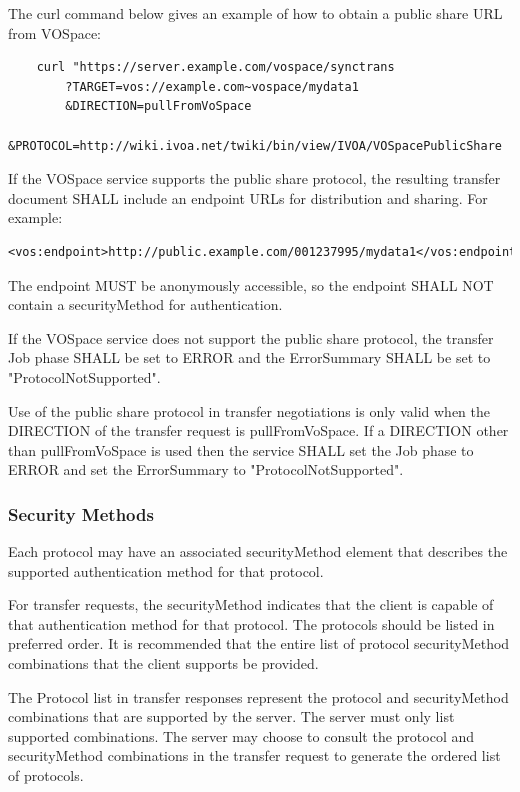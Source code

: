 \documentclass[11pt,a4paper]{ivoa}
\begin{document}
The curl command below gives an example of how to obtain a public share URL from VOSpace:

\begin{verbatim}
    curl "https://server.example.com/vospace/synctrans
        ?TARGET=vos://example.com~vospace/mydata1
        &DIRECTION=pullFromVoSpace
        &PROTOCOL=http://wiki.ivoa.net/twiki/bin/view/IVOA/VOSpacePublicShare
\end{verbatim}

If the VOSpace service supports the public share protocol, the resulting transfer document SHALL include an endpoint URLs for distribution and sharing.  For example:

\begin{verbatim}<vos:endpoint>http://public.example.com/001237995/mydata1</vos:endpoint>\end{verbatim}

The endpoint MUST be anonymously accessible, so the endpoint SHALL NOT contain a securityMethod for authentication.

If the VOSpace service does not support the public share protocol, the transfer Job phase SHALL be set to ERROR and the ErrorSummary SHALL be set to "ProtocolNotSupported".

Use of the public share protocol in transfer negotiations is only valid when the DIRECTION of the transfer request is pullFromVoSpace.	  If a DIRECTION other than pullFromVoSpace is used then the service SHALL set the Job phase to ERROR and set the ErrorSummary to "ProtocolNotSupported".

\subsubsection{Security Methods}
Each protocol may have an associated securityMethod element that describes the supported authentication method for that protocol.

For transfer requests, the securityMethod indicates that the client is capable of that authentication method for that protocol.  The protocols should be listed in preferred order.  It is recommended that the entire list of protocol securityMethod combinations that the client supports be provided.

The Protocol list in transfer responses represent the protocol and securityMethod combinations that are supported by the server.  The server must only list supported combinations.  The server may choose to consult the protocol and securityMethod combinations in the transfer request to generate the ordered list of protocols.
\end{document}
